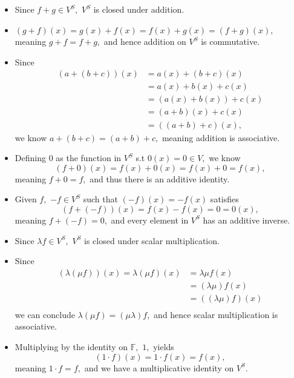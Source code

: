 \documentclass[12pt]{article}
\begin{document}
\begin{enumerate}
    \begin{itemize}
      \item Since $f + g \in V^{S},$ $V^{S}$ is closed under addition.
      \item $(g + f)(x) = g(x) + f(x) = f(x) + g(x) = (f + g)(x),$
        meaning $g + f = f+ g,$ and hence addition on $V^{S}$ is commutative.
      \item Since
        \begin{align*}
          (a + (b + c))(x) &= a(x) + (b+c)(x) \\
          &= a(x) + b(x) + c(x) \\
          &= (a(x) + b(x)) + c(x) \\
          &= (a + b)(x) + c(x) \\
          &= ((a + b) + c)(x),
        \end{align*}
        we know $a + (b+ c) = (a+ b) + c,$ meaning addition is associative.

      \item Defining $0$ as the function in $V^{S}$ s.t $0(x) = 0 \in
        V,$ we know $$
        (f + 0)(x) = f(x) + 0(x) = f(x) + 0 = f(x),
        $$
        meaning $f + 0 = f,$ and thus there is an additive identity.

      \item Given $f,$ $-f \in V^{S}$ such that $(-f)(x) = -f(x)$ satisfies
        $$
        ( f + (-f))(x) = f(x) - f(x) = 0 = 0(x),
        $$
        meaning $f + (-f) = 0,$ and every element in $V^{S}$ has an
        additive inverse.

      \item Since $\lambda f \in V^{S},$ $V^{S}$ is closed under
        scalar multiplication.
      \item Since
        \begin{align*}
          (\lambda(\mu f))(x) =  \lambda (\mu f)(x) &= \lambda \mu f(x)  \\
          &= (\lambda \mu) f(x) \\
          &= ((\lambda \mu) f)(x) \\
        \end{align*}
        we can conclude $\lambda (\mu f) = (\mu \lambda) f,$ and
        hence scalar multiplication is associative.

      \item Multiplying by the identity on $\mathbb F,$ $1,$ yields $$
        (1 \cdot f)(x) = 1 \cdot f(x) = f(x),
        $$
        meaning $1 \cdot f = f,$ and we have a multiplicative
        identity on $V^{S}.$


\end{itemize}
\end{enumerate}
\end{document}

